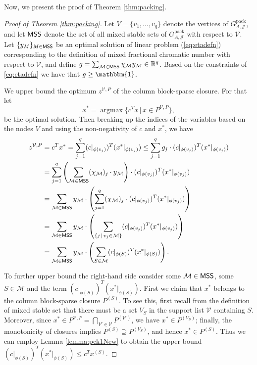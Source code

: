 \documentclass[smallextended]{svjour3}
\begin{document}
Now, we present the proof of Theorem \ref{thm:packing}.

\begin{proof}[Proof of Theorem \ref{thm:packing}]
		Let $V = \{v_1, \ldots, v_q\}$ denote the vertices of ${G^{\textrm{pack}}_{A, {\mathcal{J}}}}$, and let $\sf{MSS}$ denote the set of all mixed stable sets of ${G^{\textrm{pack}}_{A, {\mathcal{J}}}}$ with respect to $\mathcal{V}$.	Let $\{y_M\}_{M \in \sf{MSS}}$ be an optimal solution of linear problem (\ref{eq:etadefn}) corresponding to the definition of mixed fractional chromatic number with respect to $\mathcal{V}$, and define $g = \sum_{{\mathcal{M}} \in \sf{MSS}} \chi_{\mathcal{M}} y_{\mathcal{M}} \in {\mathbb{R}}^{q}$. Based on the constraints of \eqref{eq:etadefn} we have that $g \geq {\mathbbm{1}}$.
		
		We upper bound the optimum $z^{{\mathcal{V}},P}$ of the column block-sparse closure. For that let $$x^* = \operatorname{argmax} \{c^Tx\,|\,x \in P^{\mathcal{V}, P}\},$$ be the optimal solution. Then breaking up the indices of the variables based on the nodes $V$ and using the non-negativity of $c$ and $x^*$, we have
	\begin{align*}
		z^{\mathcal{V}, P} &= c^T x^* = \sum_{j = 1}^q (c|_{\phi(v_j)})^T (x^*|_{\phi(v_j)}) \leq \sum_{j=1}^{q} g_j \cdot (c|_{\phi(v_j)})^T (x^*|_{\phi(v_j)})  \\
		& =  \sum_{j=1}^{q} \left(\sum_{{\mathcal{M}} \in \sf{MSS}} (\chi_{\mathcal{M}})_j \cdot  y_{\mathcal{M}} \right) \cdot (c|_{\phi(v_j)})^T (x^*|_{\phi(v_j)})\\
		&=\sum_{{\mathcal{M}} \in \sf{MSS}} y_{\mathcal{M}} \cdot \left(\sum_{j=1}^{q} (\chi_{\mathcal{M}})_j \cdot (c|_{\phi(v_j)})^T (x^*|_{\phi(v_j)})\right)\\
		&= \sum_{{\mathcal{M}} \in \sf{MSS}} y_{\mathcal{M}} \cdot \left(\sum_{\{j\,|\,v_j \in {\mathcal{M}}\}} (c|_{\phi(v_j)})^T (x^*|_{\phi(v_j)})\right)\\
		&=  \sum_{{\mathcal{M}} \in \sf{MSS}} y_{\mathcal{M}} \cdot \left(\sum_{S \in {\mathcal{M}}} (c|_{\phi(S)})^T (x^*|_{\phi(S)})\right).
	\end{align*}
	
	To further upper bound the right-hand side consider some ${\mathcal{M}} \in \sf{MSS}$, some $S \in {\mathcal{M}}$ and the term $(c|_{\phi(S)})^T (x^*|_{\phi(S)})$. First we claim that $x^*$ belongs to the column block-sparse closure $P^{(S)}$. To see this, first recall from the definition of mixed stable set that there must be a set $V_S$ in the support list ${\mathcal{V}}$ containing $S$. Moreover, since $x^* \in P^{{\mathcal{V}},P} = \bigcap_{V' \in {\mathcal{V}}} P^{(V')}$, we have $x^* \in P^{(V_S)}$; finally, the monotonicity of closures implies $P^{(S)} \supseteq P^{(V_S)}$, and hence $x^* \in P^{(S)}$. Thus we can employ Lemma \ref{lemma:pck1New} to obtain the upper bound $(c|_{\phi(S)})^T (x^*|_{\phi(S)}) \le c^T x^{(S)}$.
	

\end{proof}
\end{document}
